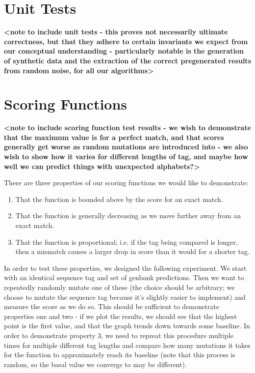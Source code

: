 \documentclass{l4proj}
\begin{document}
\section{Unit Tests}

\textbf{<note to include unit tests - this proves not necessarily ultimate correctness, but that they adhere to certain invariants we expect from our conceptual understanding - particularly notable is the generation of synthetic data and the extraction of the correct pregenerated results from random noise, for all our algorithms>}

\section{Scoring Functions}
\textbf{<note to include scoring function test results - we wish to demonstrate that the maximum value is for a perfect match, and that scores generally get worse as random mutations are introduced into - we also wish to show how it varies for different lengths of tag, and maybe how well we can predict things with unexpected alphabets?>}

There are three properties of our scoring functions we would like to demonstrate:
\begin{enumerate}
	\item That the function is bounded above by the score for an exact match.
	\item That the function is generally decreasing as we move further away from an exact match.
	\item That the function is proportional; i.e. if the tag being compared is longer, then a mismatch causes a larger drop in score than it would for a 		shorter tag.
\end{enumerate}

In order to test these properties, we designed the following experiment. We start with an identical sequence tag and set of genbank predictions. Then we want to repeatedly randomly mutate one of these (the choice should be arbitrary; we choose to mutate the sequence tag because it's slightly easier to implement) and measure the score as we do so. This should be sufficient to demonstrate properties one and two - if we plot the results, we should see that the highest point is the first value, and that the graph trends down towards some baseline. In order to demonstrate property 3, we need to repreat this procedure multiple times for multiple different tag lengths and compare how many mutations it takes for the function to approximately reach its baseline (note that this process is random, so the basal value we converge to may be different).
\end{document}
